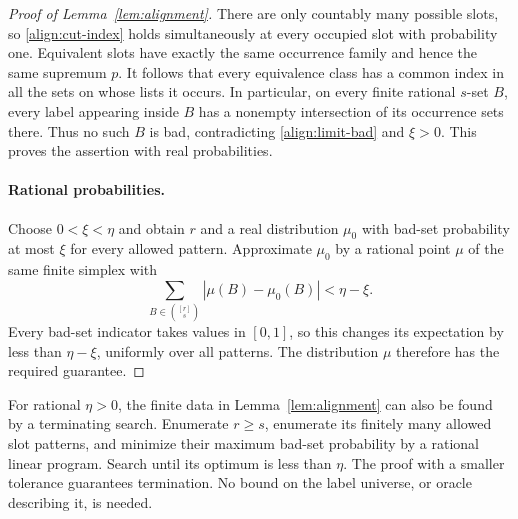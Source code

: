 \begin{proof}[Proof of Lemma~\ref{lem:alignment}]
There are only countably many possible slots, so
\eqref{align:cut-index} holds simultaneously at every occupied slot with
probability one.  Equivalent slots have exactly the same occurrence
family and hence the same supremum $p$.  It follows that every equivalence
class has a common index in all the sets on whose lists it occurs.
In particular, on every finite rational $s$-set $B$, every label appearing
inside $B$ has a nonempty intersection of its occurrence sets there.
Thus no such $B$ is bad, contradicting \eqref{align:limit-bad} and
$\xi>0$.  This proves the assertion with real probabilities.

\paragraph{Rational probabilities.}
Choose $0<\xi<\eta$ and obtain $r$ and a real distribution $\mu_0$ with
bad-set probability at most $\xi$ for every allowed pattern.  Approximate
$\mu_0$ by a rational point $\mu$ of the same finite simplex with
\[
 \sum_{B\in\binom{[r]}s}|\mu(B)-\mu_0(B)|<\eta-\xi.
\]
Every bad-set indicator takes values in $[0,1]$, so this changes its
expectation by less than $\eta-\xi$, uniformly over all patterns.
The distribution $\mu$ therefore has the required guarantee.
\end{proof}

\begin{remark}\label{align:effective}
For rational $\eta>0$, the finite data in Lemma~\ref{lem:alignment} can
also be found by a terminating search.  Enumerate $r\geq s$, enumerate
its finitely many allowed slot patterns, and minimize their maximum
bad-set probability by a rational linear program.  Search until its
optimum is less than $\eta$.  The proof with a smaller tolerance guarantees
termination.  No bound on the label universe, or oracle describing it, is
needed.
\end{remark}
